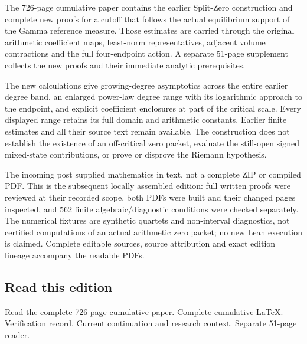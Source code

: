 \documentclass[
]{article}
\begin{document}
The 726-page cumulative paper contains the earlier Split-Zero
construction and complete new proofs for a cutoff that follows the
actual equilibrium support of the Gamma reference measure. Those
estimates are carried through the original arithmetic coefficient maps,
least-norm representatives, adjacent volume contractions and the full
four-endpoint action. A separate 51-page supplement collects the new
proofs and their immediate analytic prerequisites.

The new calculations give growing-degree asymptotics across the entire
earlier degree band, an enlarged power-law degree range with its
logarithmic approach to the endpoint, and explicit coefficient
enclosures at part of the critical scale. Every displayed range retains
its full domain and arithmetic constants. Earlier finite estimates and
all their source text remain available. The construction does not
establish the existence of an off-critical zero packet, evaluate the
still-open signed mixed-state contributions, or prove or disprove the
Riemann hypothesis.

The incoming post supplied mathematics in text, not a complete ZIP or
compiled PDF. This is the subsequent locally assembled edition: full
written proofs were reviewed at their recorded scope, both PDFs were
built and their changed pages inspected, and 562 finite
algebraic/diagnostic conditions were checked separately. The numerical
fixtures are synthetic quartets and non-interval diagnostics, not
certified computations of an actual arithmetic zero packet; no new Lean
execution is claimed. Complete editable sources, source attribution and
exact edition lineage accompany the readable PDFs.

\subsection{Read this edition}\label{read-this-edition-3}

\href{https://github.com/KokunoYumeto/zeta-function-research-reader/blob/main/workbenches/splitzero-tandem/continuations/20260917-moving-cutoff-growing-ratio/15_CURRENT_MIXED_CONTROL_READER.pdf}{Read
the complete 726-page cumulative paper}.
\href{https://github.com/KokunoYumeto/zeta-function-research-reader/blob/main/workbenches/splitzero-tandem/continuations/20260917-moving-cutoff-growing-ratio/14_CURRENT_KERNEL_AND_MULTIPLICITY_PROOFS.tex}{Complete
cumulative LaTeX}.
\href{https://github.com/KokunoYumeto/zeta-function-research-reader/blob/main/workbenches/splitzero-tandem/continuations/20260917-moving-cutoff-growing-ratio/12_VALIDATION.md}{Verification
record}.
\href{https://github.com/KokunoYumeto/zeta-function-research-reader/blob/main/workbenches/splitzero-tandem/continuations/20260917-moving-cutoff-growing-ratio/00_CONTINUE_HERE.md}{Current
continuation and research context}.
\href{https://github.com/KokunoYumeto/zeta-function-research-reader/blob/main/workbenches/splitzero-tandem/continuations/20260917-moving-cutoff-growing-ratio/GROWING_RATIO_PROOF_SUPPLEMENT.pdf}{Separate
51-page reader}.
\end{document}

